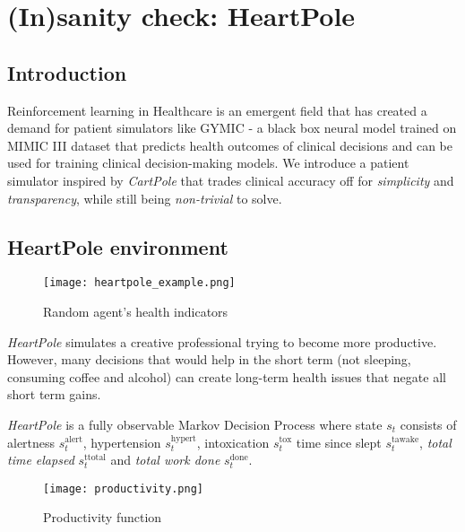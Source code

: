 \chapter{(In)sanity check: HeartPole}
\label{ch:heartpole}



\section{Introduction}
\label{sec:heartpole-introduction}

Reinforcement learning in Healthcare is an emergent field that has created a demand for patient simulators like GYMIC \cite{gym-sepsis} - a black box neural model trained on MIMIC III dataset \cite{johnsonMIMICIIIFreelyAccessible2016} that predicts health outcomes of clinical decisions and can be used for training clinical decision-making models. We introduce a patient simulator inspired by \emph{CartPole} \cite{cartpole} that trades clinical accuracy off for \emph{simplicity} and \emph{transparency}, while still being \emph{non-trivial} to solve.

\section{HeartPole environment}
\label{sec:heartpole-methodology}

\begin{figure}
    \centering
    \texttt{[image: heartpole\_example.png]}
    \caption{Random agent's health indicators}
    \label{fig:random}
\end{figure}

\emph{HeartPole} simulates a creative professional trying to become more productive.
However, many decisions that would help in the short term (not sleeping, consuming coffee and alcohol) can create long-term health issues that negate all short term gains.

\emph{HeartPole} is a fully observable Markov Decision Process \cite{mdp} where state $s_t$ consists of alertness $s^\text{alert}_t$, hypertension $s^\text{hypert}_t$, intoxication $s^\text{tox}_t$ time since slept $s^\text{tawake}_t$, \emph{total time elapsed} $s^\text{ttotal}_t$ and \emph{total work done} $s^\text{done}_t$.

\begin{figure}
    \centering
    \texttt{[image: productivity.png]}
    \caption{Productivity function}
    \label{fig:productivity}
\end{figure}

